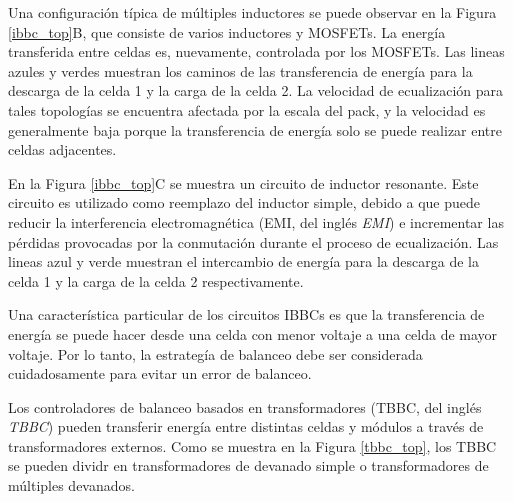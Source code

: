 \documentclass[10pt,a4paper]{article}
\newcounter{subsubsubsection}[subsubsection]
\begin{document}
Una configuraci\'on t\'ipica de m\'ultiples inductores se puede observar en la
Figura \ref{ibbc_top}B, que consiste de varios inductores y MOSFETs. La
energ\'ia transferida entre celdas es, nuevamente, controlada por los MOSFETs. 
Las lineas azules y verdes muestran los caminos de las transferencia de 
energ\'ia para la descarga de la celda 1 y la carga de la celda 2. La velocidad 
de ecualizaci\'on para tales topolog\'ias se encuentra afectada por la escala 
del pack, y la velocidad es generalmente baja porque la transferencia de 
energ\'ia solo se puede realizar entre celdas adjacentes.

En la Figura \ref{ibbc_top}C se muestra un circuito de inductor resonante. Este
circuito es utilizado como reemplazo del inductor simple, debido a que puede
reducir la interferencia electromagn\'etica (\acrshort{EMI}, del ingl\'es
\emph{\acrlong{EMI}}) e incrementar las p\'erdidas provocadas por la
conmutaci\'on durante el proceso de ecualizaci\'on. Las lineas azul y verde
muestran el intercambio de energ\'ia para la descarga de la celda 1 y la carga
de la celda 2 respectivamente.

Una caracter\'istica particular de los circuitos \acrshort{IBBC}s es que la
transferencia de energ\'ia se puede hacer desde una celda con menor voltaje a
una celda de mayor voltaje. Por lo tanto, la estrateg\'ia de balanceo debe ser
considerada cuidadosamente para evitar un error de balanceo.


Los controladores de balanceo basados en transformadores (\acrshort{TBBC}, del
ingl\'es \emph{\acrlong{TBBC}}) pueden transferir energ\'ia entre distintas celdas y
m\'odulos a trav\'es de transformadores externos. Como se muestra en la Figura
\ref{tbbc_top}, los \acrshort{TBBC} se pueden dividr en transformadores de
devanado simple o transformadores de m\'ultiples devanados.
\end{document}
